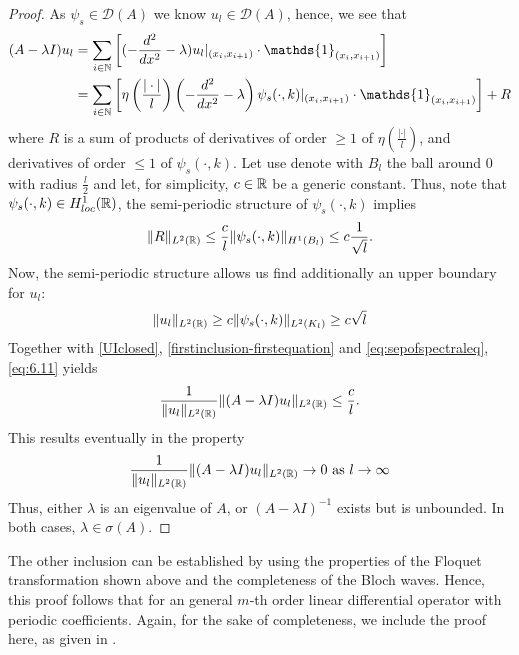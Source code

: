 \begin{theorem}
\begin{proof}
	 	As $\psi_{s} \in \mathcal{D}(A)$ we know $u_{l} \in \mathcal{D}(A)$, hence, we see that
		\begin{align}
			(A - \lambda I) u_{l} & = \sum_{i \in \N} \left[ (- \frac{d^{2}}{dx^{2}} - \lambda) u_{l}|_{(x_{i}, x_{i+1})} \cdot \mathds{1}_{(x_{i}, x_{i+1})} \right] \label{eq:sepofspectraleq} \\
				& = \sum_{i \in \N} \left[ \eta\left(\frac{|\cdot|}{l}\right) \left(- \frac{d^{2}}{dx^{2}} - \lambda \right) \psi_{s}(\cdot, k) |_{(x_{i}, x_{i+1})} \cdot \mathds{1}_{(x_{i}, x_{i+1})} \right] + R \notag
		\end{align}
		where $R$ is a sum of products of derivatives of order $\geq 1$ of $\eta\left(\frac{|\cdot|}{l}\right)$, and derivatives of order $\leq 1$ of $\psi_{s}(\cdot, k)$. Let use denote with $B_{l}$ the ball around $0$ with radius $\frac{l}{2}$ and let, for simplicity, $c \in \mathbb{R}$ be a generic constant. Thus, note that $\psi_{s}(\cdot, k) \in H^{1}_{loc}(\mathbb{R})$, the semi-periodic structure of $\psi_{s}(\cdot, k)$ implies
		\begin{equation}
			 \| R \|_{L^{2}(\mathbb{R})} \leq \frac{c}{l} \| \psi_{s}(\cdot, k) \|_{H^{1}(B_{l})} \leq c \frac{1}{\sqrt{l}}. \label{eq:estimofR}
		\end{equation}
		Now, the semi-periodic structure allows us find additionally an upper boundary for $u_{l}$:
		\begin{equation}
			\| u_{l} \|_{L^{2}(\mathbb{R})} \geq c \| \psi_{s}(\cdot, k) \|_{L^{2}(K_{l})} \geq c \sqrt{l} \label{eq:6.11}
		\end{equation} 
		Together with \eqref{UIclosed}, \eqref{firstinclusion-firstequation} and \eqref{eq:sepofspectraleq}, \eqref{eq:6.11} yields
		\[ \frac{1}{\|u_{l}\|_{L^{2}(\mathbb{R})}}\| (A - \lambda I) u_{l} \|_{L^{2}(\mathbb{R})} \leq \frac{c}{l}. \]
		This results eventually in the property
			\[ \frac{1}{\|u_{l} \|_{L^{2}(\mathbb{R})}} \| (A - \lambda I) u_{l} \|_{L^{2}(\mathbb{R})} \rightarrow 0 \text{ as } l \rightarrow \infty \]
		Thus, either $\lambda$ is an eigenvalue of $A$, or $(A - \lambda I)^{-1}$ exists but is unbounded. In both cases, $\lambda \in \sigma(A)$.
	\end{proof}
\end{theorem}	

The other inclusion can be established by using the properties of the Floquet transformation shown above and the completeness of the Bloch waves. Hence, this proof follows that for an general $m$-th order linear differential operator with periodic coefficients. Again, for the sake of completeness, we include the proof here, as given in \cite[section 3.6]{dorfler2011photonic}.

